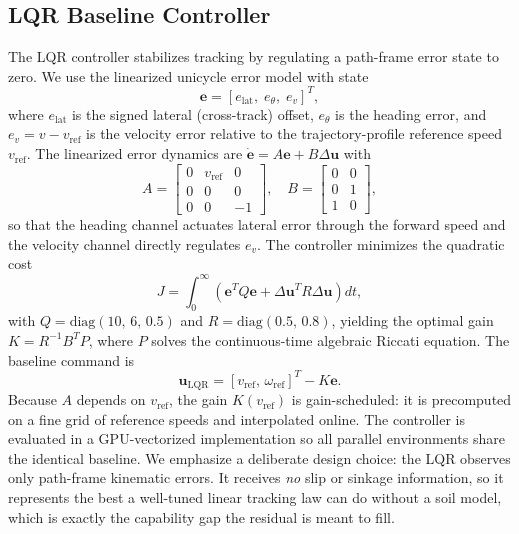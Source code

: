 \documentclass[conference]{IEEEtran}
\begin{document}
\subsection{LQR Baseline Controller}
The LQR controller stabilizes tracking by regulating a path-frame error state to zero. We use the linearized unicycle error model with state
\begin{equation}
\mathbf{e} = [e_{\text{lat}},\; e_{\theta},\; e_{v}]^T,
\end{equation}
where $e_{\text{lat}}$ is the signed lateral (cross-track) offset, $e_{\theta}$ is the heading error, and $e_{v} = v - v_{\text{ref}}$ is the velocity error relative to the trajectory-profile reference speed $v_{\text{ref}}$. The linearized error dynamics are $\dot{\mathbf{e}} = A\mathbf{e} + B\Delta\mathbf{u}$ with
\begin{equation}
A = \begin{bmatrix} 0 & v_{\text{ref}} & 0 \\ 0 & 0 & 0 \\ 0 & 0 & -1 \end{bmatrix},\quad
B = \begin{bmatrix} 0 & 0 \\ 0 & 1 \\ 1 & 0 \end{bmatrix},
\end{equation}
so that the heading channel actuates lateral error through the forward speed and the velocity channel directly regulates $e_v$. The controller minimizes the quadratic cost
\begin{equation}
J = \int_0^\infty \left(\mathbf{e}^T Q \mathbf{e} + \Delta\mathbf{u}^T R \Delta\mathbf{u}\right) dt,
\end{equation}
with $Q = \mathrm{diag}(10,\,6,\,0.5)$ and $R = \mathrm{diag}(0.5,\,0.8)$, yielding the optimal gain $K = R^{-1}B^T P$, where $P$ solves the continuous-time algebraic Riccati equation. The baseline command is
\begin{equation}
\mathbf{u}_{\text{LQR}} = [v_{\text{ref}},\, \omega_{\text{ref}}]^T - K\mathbf{e}.
\end{equation}
Because $A$ depends on $v_{\text{ref}}$, the gain $K(v_{\text{ref}})$ is gain-scheduled: it is precomputed on a fine grid of reference speeds and interpolated online. The controller is evaluated in a GPU-vectorized implementation so all parallel environments share the identical baseline. We emphasize a deliberate design choice: the LQR observes only path-frame kinematic errors. It receives \emph{no} slip or sinkage information, so it represents the best a well-tuned linear tracking law can do without a soil model, which is exactly the capability gap the residual is meant to fill.
\end{document}

